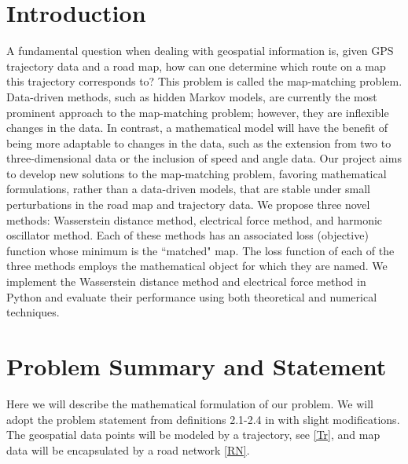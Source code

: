 \documentclass{article}
\numberwithin{equation}{section}
\theoremstyle{definition}
\begin{document}
\section{Introduction}
A fundamental question when dealing with geospatial information is, given GPS trajectory data and a road map, how can one determine which route on a map this trajectory corresponds to? This problem is called the map-matching problem. 
Data-driven methods, such as hidden Markov models, are currently the most prominent approach to the map-matching problem; however, they are inflexible changes in the data. In contrast, a mathematical model will have the benefit of being more adaptable to changes in the data, such as the extension from two to three-dimensional data or the inclusion of speed and angle data. 
Our project aims to develop new solutions to the map-matching problem, favoring mathematical formulations, rather than a data-driven models, that are stable under small perturbations in the road map and trajectory data. We propose three novel methods: Wasserstein distance method, electrical force method, and harmonic oscillator method. Each of these methods has an associated loss (objective) function whose minimum is the ``matched" map.
The loss function of each of the three methods employs the mathematical object for which they are named. 
We implement the Wasserstein distance method and electrical force method in Python and evaluate their performance using both theoretical and numerical techniques. 



\section{Problem Summary and Statement} \label{PS}

Here we will describe the mathematical formulation of our problem. We will adopt the problem statement from definitions 2.1-2.4 in \cite{CXHZ} with slight modifications. The geospatial data points will be modeled by a trajectory, see \autoref{Tr}, and map data will be encapsulated by a road network \autoref{RN}.
\end{document}
